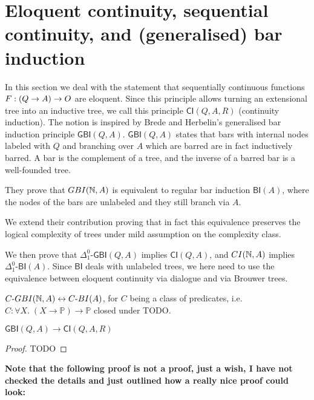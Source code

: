 \documentclass[a4paper,UKenglish,cleveref, autoref, thm-restate]{lipics-v2021}
\begin{document}
\section{Eloquent continuity, sequential continuity, and (generalised) bar induction}

\newcommand\CI{\mathsf{CI}}
\newcommand\GBI{\mathsf{GBI}}
\newcommand\BI{\mathsf{BI}}

In this section we deal with the statement that sequentially continuous functions $F : (Q \to A) \to O$ are eloquent.
Since this principle allows turning an extensional tree into an inductive tree,
we call this principle $\CI(Q,A,R)$ (continuity induction).
The notion is inspired by Brede and Herbelin's generalised bar induction principle $\GBI(Q,A)$.
$\GBI(Q,A)$ states that bars with internal nodes labeled with $Q$ and branching over $A$
which are barred are in fact inductively barred.
A bar is the complement of a tree,
and the inverse of a barred bar is a well-founded tree.

They prove that $\GBI(\nat,A)$ is equivalent to regular bar induction $\BI(A)$,
where the nodes of the bars are unlabeled and they still branch via $A$.

We extend their contribution proving that in fact this equivalence preserves the logical complexity of
trees under mild assumption on the complexity class.

We then prove that $\Delta^0_1\text{-}\GBI(Q,A)$ implies $\CI(Q,A)$,
and $\CI(\nat,A)$ implies $\Delta^0_1\text{-}\BI(A)$.
Since $\BI$ deals with unlabeled trees,
we here need to use the equivalence between eloquent continuity via dialogue and via Brouwer trees.

\begin{lemma}
  $C\text{-}\GBI(\nat,A) \leftrightarrow C\text{-}\BI(A)$,
  for $C$ being a class of predicates, i.e.\ $C : \forall X.\;(X \to \mathbb{P}) \to \mathbb{P}$
  closed under TODO.
\end{lemma}

\begin{lemma}
  $\GBI(Q,A) \to \CI(Q,A,R)$
\end{lemma}
\begin{proof}
  TODO
\end{proof}

\textbf{Note that the following proof is not a proof, just a wish, I have not checked the details and just outlined how a really nice proof could look:}
\end{document}
